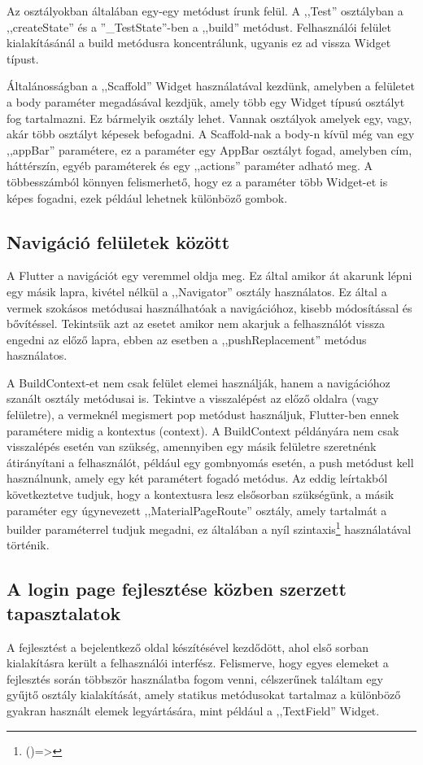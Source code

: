 \documentclass{thesis-ekf}
\theoremstyle{definition}
\theoremstyle{remark}
\begin{document}
	Az osztályokban általában egy-egy metódust írunk felül. A ,,Test'' osztályban a ,,createState'' és a ''\_TestState''-ben a ,,build'' metódust. Felhasználói felület kialakításánál a build metódusra koncentrálunk, ugyanis ez ad vissza Widget típust.
	
	Általánosságban a ,,Scaffold'' Widget használatával kezdünk, amelyben a felületet a body paraméter megadásával kezdjük, amely több egy Widget típusú osztályt fog tartalmazni. Ez bármelyik osztály lehet. Vannak osztályok amelyek egy, vagy, akár  több osztályt képesek befogadni. A Scaffold-nak a body-n kívül még van egy ,,appBar'' paramétere, ez a paraméter egy AppBar osztályt fogad, amelyben cím, háttérszín, egyéb paraméterek és egy ,,actions'' paraméter adható meg. A többesszámból könnyen felismerhető, hogy ez a paraméter több Widget-et is képes fogadni, ezek például lehetnek különböző gombok.
	\subsection{Navigáció felületek között}
	A Flutter a navigációt egy veremmel oldja meg. Ez által amikor át akarunk lépni egy másik lapra, kivétel nélkül a ,,Navigator'' osztály használatos. Ez által a vermek szokásos metódusai használhatóak a navigációhoz, kisebb módosítással és bővítéssel. Tekintsük azt az esetet amikor nem akarjuk a felhasználót vissza engedni az előző lapra, ebben az esetben a ,,pushReplacement'' metódus használatos.
	
	A BuildContext-et nem csak felület elemei használják, hanem a navigációhoz szanált osztály metódusai is. Tekintve a visszalépést az előző oldalra (vagy felületre), a vermeknél megismert pop metódust használjuk, Flutter-ben  ennek paramétere midig a kontextus (context). A BuildContext példányára nem csak visszalépés esetén van szükség, amennyiben egy másik felületre szeretnénk átirányítani a felhasználót, például egy gombnyomás esetén, a push metódust kell használnunk, amely egy két paramétert fogadó metódus. Az eddig leírtakból következtetve tudjuk, hogy a kontextusra lesz elsősorban szükségünk, a másik paraméter egy úgynevezett ,,MaterialPageRoute'' osztály, amely tartalmát a builder paraméterrel tudjuk megadni, ez általában a nyíl szintaxis\footnote{()=>} használatával történik.
	\subsection{A login page fejlesztése közben szerzett tapasztalatok}
	A fejlesztést a bejelentkező oldal készítésével kezdődött, ahol első sorban kialakításra került a felhasználói interfész. Felismerve, hogy egyes elemeket a fejlesztés során többször használatba fogom venni, célszerűnek találtam egy gyűjtő osztály kialakítását, amely statikus metódusokat tartalmaz a különböző gyakran használt elemek legyártására, mint például a ,,TextField'' Widget.
	
\end{document}
